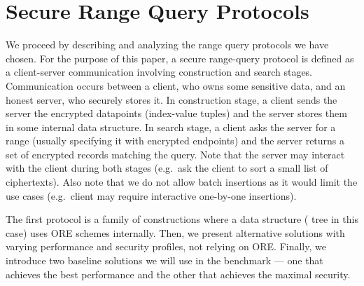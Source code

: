 	

	

	

	

	

\section{Secure Range Query Protocols}

	We proceed by describing and analyzing the range query protocols we have chosen.
	For the purpose of this paper, a secure range-query protocol is defined as a client-server communication involving construction and search stages.
	Communication occurs between a client, who owns some sensitive data, and an honest server, who securely stores it.
	In construction stage, a client sends the server the encrypted datapoints (index-value tuples) and the server stores them in some internal data structure.
	In search stage, a client asks the server for a range (usually specifying it with encrypted endpoints) and the server returns a set of encrypted records matching the query.
	Note that the server may interact with the client during both stages (e.g.\ ask the client to sort a small list of ciphertexts).
	Also note that we do not allow batch insertions as it would limit the use cases (e.g.\ client may require interactive one-by-one insertions).

	The first protocol is a family of constructions where a data structure ({\BPlus} tree in this case) uses ORE schemes internally.
	Then, we present alternative solutions with varying performance and security profiles, not relying on ORE\@.
	Finally, we introduce two baseline solutions we will use in the benchmark --- one that achieves the best performance and the other that achieves the maximal security.

	

	

	

	

	

	
